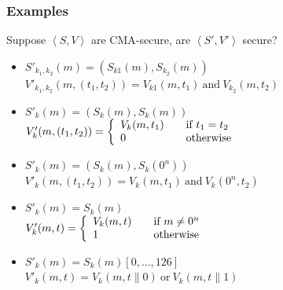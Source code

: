 \begin{frame}\frametitle{Examples}
\begin{exampleblock}{Suppose $\left<S, V\right>$ are CMA-secure,  are $\left<S', V'\right>$ secure?}
\begin{itemize}
\item $S'_{k_{1},k_{2}}(m) = (S_{k1}(m),S_{k_{2}}(m))$\\
$V'_{k_{1},k_{2}}(m,(t_{1},t_{2})) = V_{k1}(m,t_{1})\ \text{and}\ V_{k_{2}}(m,t_{2})$
\item $S'_{k}(m) = (S_{k}(m),S_{k}(m))$\\
$ V'_{k}(m,(t_{1},t_{2})) = \left\{ 
  \begin{array}{l l}
    V_{k}(m,t_{1}) & \quad \text{if $t_{1}=t_{2}$}\\
    0 & \quad \text{otherwise}\\
  \end{array} \right. $
\item $S'_{k}(m) = (S_{k}(m),S_{k}(0^{n}))$\\
$ V'_{k}(m,(t_{1},t_{2})) = V_{k}(m,t_{1})\ \text{and}\ V_{k}(0^{n},t_{2})$
\item $S'_{k}(m) = S_{k}(m)$\\
$ V'_{k}(m,t) = \left\{ 
  \begin{array}{l l}
    V_{k}(m,t) & \quad \text{if $m \neq 0^{n}$}\\
    1 & \quad \text{otherwise}\\
  \end{array} \right. $
\item $S'_{k}(m) = S_{k}(m)[0,\dots,126]$ \\
$V'_{k}(m,t) = V_{k}(m,t\| 0)\ \text{or}\ V_{k}(m,t\| 1)$
\end{itemize}
\end{exampleblock}
\end{frame}
